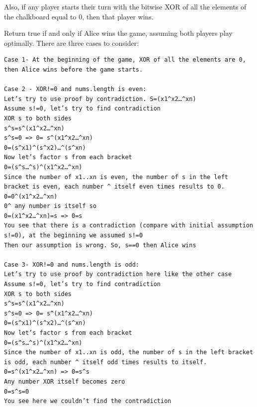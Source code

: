 \documentclass[9pt, b5paaper]{book}
\begin{document}
Also, if any player starts their turn with the bitwise XOR of all the elements of the chalkboard equal to 0, then that player wins.

Return true if and only if Alice wins the game, assuming both players play optimally.
There are three cases to consider:
\begin{verbatim}
Case 1- At the beginning of the game, XOR of all the elements are 0, then Alice wins before the game starts.

Case 2 - XOR!=0 and nums.length is even:
Let’s try to use proof by contradiction. S=(x1^x2…^xn)
Assume s!=0, let’s try to find contradiction
XOR s to both sides
s^s=s^(x1^x2…^xn)
s^s=0 => 0= s^(x1^x2…^xn)
0=(s^x1)^(s^x2)…^(s^xn)
Now let’s factor s from each bracket
0=(s^s…^s)^(x1^x2…^xn)
Since the number of x1..xn is even, the number of s in the left bracket is even, each number ^ itself even times results to 0.
0=0^(x1^x2…^xn)
0^ any number is itself so
0=(x1^x2…^xn)=s => 0=s
You see that there is a contradiction (compare with initial assumption s!=0), at the beginning we assumed s!=0
Then our assumption is wrong. So, s==0 then Alice wins

Case 3- XOR!=0 and nums.length is odd:
Let’s try to use proof by contradiction here like the other case
Assume s!=0, let’s try to find contradiction
XOR s to both sides
s^s=s^(x1^x2…^xn)
s^s=0 => 0= s^(x1^x2…^xn)
0=(s^x1)^(s^x2)…^(s^xn)
Now let’s factor s from each bracket
0=(s^s…^s)^(x1^x2…^xn)
Since the number of x1..xn is odd, the number of s in the left bracket is odd, each number ^ itself odd times results to itself.
0=s^(x1^x2…^xn) => 0=s^s
Any number XOR itself becomes zero
0=s^s=0
You see here we couldn’t find the contradiction
\end{verbatim}
\end{document}
